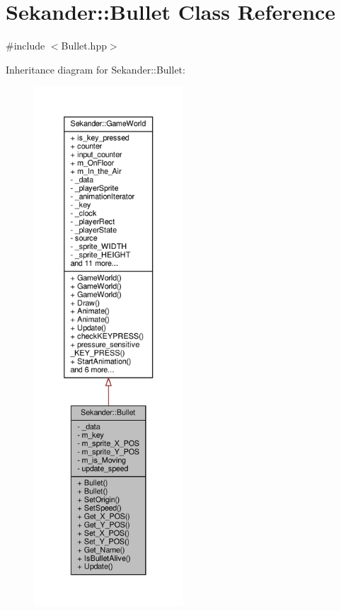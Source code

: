 \hypertarget{classSekander_1_1Bullet}{}\section{Sekander\+:\+:Bullet Class Reference}
\label{classSekander_1_1Bullet}


{\ttfamily \#include $<$Bullet.\+hpp$>$}



Inheritance diagram for Sekander\+:\+:Bullet\+:
\nopagebreak
\begin{figure}[H]
\begin{center}
\leavevmode
\includegraphics[height=550pt]{classSekander_1_1Bullet__inherit__graph}
\end{center}
\end{figure}


